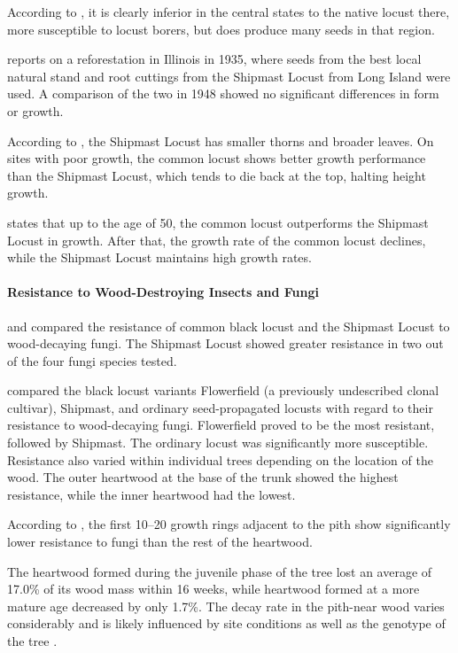 According to \citet[p.~321]{usForestService1948seedManual}, it is clearly inferior in the central states to the native locust there, more susceptible to locust borers, but does produce many seeds in that region.

\citet{minckler1948robinie} reports on a reforestation in Illinois in 1935, where seeds from the best local natural stand and root cuttings from the Shipmast Locust from Long Island were used. A comparison of the two in 1948 showed no significant differences in form or growth.

According to \citet{hopp1941robinieUnterschied}, the Shipmast Locust has smaller thorns and broader leaves. On sites with poor growth, the common locust shows better growth performance than the Shipmast Locust, which tends to die back at the top, halting height growth.

\citet{hopp1947robinie} states that up to the age of 50, the common locust outperforms the Shipmast Locust in growth. After that, the growth rate of the common locust declines, while the Shipmast Locust maintains high growth rates.

\paragraph{Resistance to Wood-Destroying Insects and Fungi}

\citet{hirt1938robinie} and \citet{toole1938robinie} compared the resistance of common black locust and the Shipmast Locust to wood-decaying fungi. The Shipmast Locust showed greater resistance in two out of the four fungi species tested.

\citet{scheffer1949robinieDecay} compared the black locust variants Flowerfield (a previously undescribed clonal cultivar), Shipmast, and ordinary seed-propagated locusts with regard to their resistance to wood-decaying fungi. Flowerfield proved to be the most resistant, followed by Shipmast. The ordinary locust was significantly more susceptible. Resistance also varied within individual trees depending on the location of the wood. The outer heartwood at the base of the trunk showed the highest resistance, while the inner heartwood had the lowest.

According to \citet{duenisch2009robineHolzJungAlt}, the first 10–20 growth rings adjacent to the pith show significantly lower resistance to fungi than the rest of the heartwood.

The heartwood formed during the juvenile phase of the tree lost an average of 17.0\% of its wood mass within 16 weeks, while heartwood formed at a more mature age decreased by only 1.7\%. The decay rate in the pith-near wood varies considerably and is likely influenced by site conditions as well as the genotype of the tree \citep{brischke2024robineDauerhaftigkeit}.

